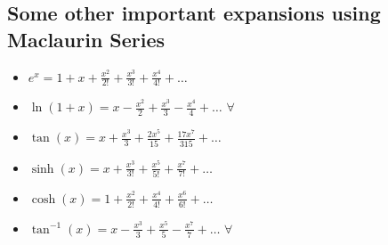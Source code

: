 \documentclass[11pt,a4paper]{article}
\begin{document}
\begin{enumerate}
\subsection{Some other important expansions using Maclaurin Series}
\begin{Large}
    \begin{itemize}
    \item $e^x = 1 + x + \frac{x^2}{2!} + \frac{x^3}{3!} + \frac{x^4}{4!} + \dots$
    \item $\ln(1 + x) = x - \frac{x^2}{2} + \frac{x^3}{3} - \frac{x^4}{4} + \dots$ $\forall$ \ 
    \item $\tan(x) = x + \frac{x^3}{3} + \frac{2x^5}{15} + \frac{17x^7}{315} + \dots$
    \item $\sinh(x) = x + \frac{x^3}{3!} + \frac{x^5}{5!} + \frac{x^7}{7!} + \dots$
    \item $\cosh(x) = 1 + \frac{x^2}{2!} + \frac{x^4}{4!} + \frac{x^6}{6!} + \dots$
    \item $\tan^{-1}(x) = x - \frac{x^3}{3} + \frac{x^5}{5} - \frac{x^7}{7} + \dots$    $\forall$ \ 
     \end{itemize}
\end{Large}




\end{enumerate}
\end{document}
